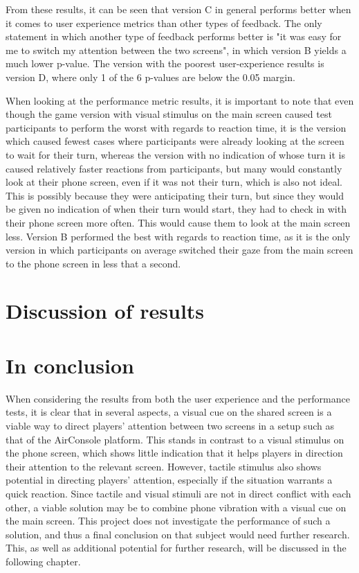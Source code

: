 From these results, it can be seen that version C in general performs better when it comes to user experience metrics than other types of feedback. The only statement in which another type of feedback performs better is "it was easy for me to switch my attention between the two screens", in which version B yields a much lower p-value. The version with the poorest user-experience results is version D, where only 1 of the 6 p-values are below the 0.05 margin.

When looking at the performance metric results, it is important to note that even though the game version with visual stimulus on the main screen caused test participants to perform the worst with regards to reaction time, it is the version which caused fewest cases where participants were already looking at the screen to wait for their turn, whereas the version with no indication of whose turn it is caused relatively faster reactions from participants, but many would constantly look at their phone screen, even if it was not their turn, which is also not ideal. This is possibly because they were anticipating their turn, but since they would be given no indication of when their turn would start, they had to check in with their phone screen more often. This would cause them to look at the main screen less. Version B performed the best with regards to reaction time, as it is the only version in which participants on average switched their gaze from the main screen to the phone screen in less that a second.

\section{Discussion of results}


\section{In conclusion}
When considering the results from both the user experience and the performance tests, it is clear that in several aspects, a visual cue on the shared screen is a viable way to direct players' attention between two screens in a setup such as that of the AirConsole platform. This stands in contrast to a visual stimulus on the phone screen, which shows little indication that it helps players in direction their attention to the relevant screen. However, tactile stimulus also shows potential in directing players' attention, especially if the situation warrants a quick reaction. Since tactile and visual stimuli are not in direct conflict with each other, a viable solution may be to combine phone vibration with a visual cue on the main screen. This project does not investigate the performance of such a solution, and thus a final conclusion on that subject would need further research. This, as well as additional potential for further research, will be discussed in the following chapter.